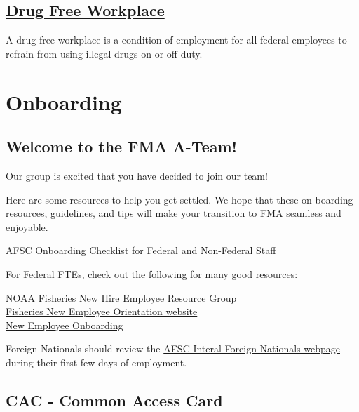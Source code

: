 \documentclass[
  letterpaper,
  DIV=11,
  numbers=noendperiod]{scrreprt}
\begin{document}
\section{\texorpdfstring{\href{https://sites.google.com/noaa.gov/ohcs/employee-resources/work-life-resources/workplace-programs/drug-free-workplace-program}{Drug
Free Workplace}}{Drug Free Workplace}}\label{drug-free-workplace}

A drug-free workplace is a condition of employment for all federal
employees to refrain from using illegal drugs on or off-duty.


\chapter{Onboarding}\label{sec-onboarding}

\section{Welcome to the FMA A-Team!}\label{welcome-to-the-fma-a-team}

Our group is excited that you have decided to join our team!

Here are some resources to help you get settled. We hope that these
on-boarding resources, guidelines, and tips will make your transition to
FMA seamless and enjoyable.

\href{https://drive.google.com/file/d/1Gxg-tw76NeptYFkya7M6JSyxsy31mmAu/view?usp=sharing}{AFSC
Onboarding Checklist for Federal and Non-Federal Staff}

For Federal FTEs, check out the following for many good resources:

\href{https://sites.google.com/noaa.gov/nmfs-erg-newhire/home?authuser=0}{NOAA
Fisheries New Hire Employee Resource Group}\\
\href{https://sites.google.com/noaa.gov/inside-fisheries-hc/human-capital/training-and-development/fisheries-onboarding-and-orientation-program}{Fisheries
New Employee Orientation website}\\
\href{https://drive.google.com/drive/folders/1aZcoJooHxNMh4kjCiv4WUgpDtszub1PI}{New
Employee Onboarding}

Foreign Nationals should review the
\href{https://sites.google.com/noaa.gov/myafsc/administrative/security/foreign-nationals}{AFSC
Interal Foreign Nationals webpage} during their first few days of
employment.

\section{CAC - Common Access Card}\label{cac---common-access-card}
\end{document}
